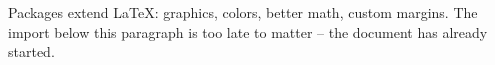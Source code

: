 \documentclass{article}
\begin{document}
\usepackage{graphicx}

Packages extend LaTeX: graphics, colors, better math, custom margins.
The import below this paragraph is too late to matter -- the document
has already started.
\end{document}
